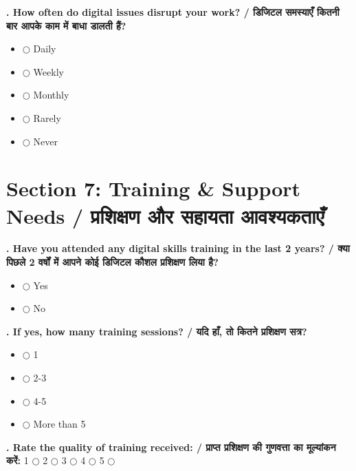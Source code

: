 \documentclass[11pt,a4paper]{article}
\newcounter{qcounter}
\begin{document}
\textbf{. How often do digital issues disrupt your work? / डिजिटल समस्याएँ कितनी बार आपके काम में बाधा डालती हैं?}
\vspace{0.1cm}
\begin{itemize}[label=, itemsep=0.1cm, leftmargin=0.5cm]
    \item $\bigcirc$ Daily
    \item $\bigcirc$ Weekly
    \item $\bigcirc$ Monthly
    \item $\bigcirc$ Rarely
    \item $\bigcirc$ Never
\end{itemize}
\vspace{0.2cm}


\section*{Section 7: Training & Support Needs / प्रशिक्षण और सहायता आवश्यकताएँ}
\vspace{0.2cm}
\textbf{. Have you attended any digital skills training in the last 2 years? / क्या पिछले 2 वर्षों में आपने कोई डिजिटल कौशल प्रशिक्षण लिया है?}
\vspace{0.1cm}
\begin{itemize}[label=, itemsep=0.1cm, leftmargin=0.5cm]
    \item $\bigcirc$ Yes
    \item $\bigcirc$ No
\end{itemize}
\vspace{0.2cm}

\textbf{. If yes, how many training sessions? / यदि हाँ, तो कितने प्रशिक्षण सत्र?}
\vspace{0.1cm}
\begin{itemize}[label=, itemsep=0.1cm, leftmargin=0.5cm]
    \item $\bigcirc$ 1
    \item $\bigcirc$ 2-3
    \item $\bigcirc$ 4-5
    \item $\bigcirc$ More than 5
\end{itemize}
\vspace{0.2cm}

\textbf{. Rate the quality of training received: / प्राप्त प्रशिक्षण की गुणवत्ता का मूल्यांकन करें:}
\vspace{0.1cm}
\vspace{0.1cm}
1 $\bigcirc$ \hspace{1cm} 2 $\bigcirc$ \hspace{1cm} 3 $\bigcirc$ \hspace{1cm} 4 $\bigcirc$ \hspace{1cm} 5 $\bigcirc$
\vspace{0.4cm}
\end{document}
